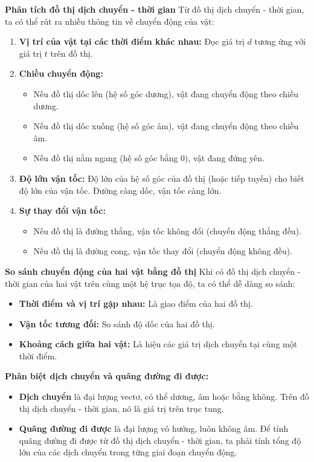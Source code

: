 \begin{hoatdong}
\textbf{Phân tích đồ thị dịch chuyển - thời gian}
Từ đồ thị dịch chuyển - thời gian, ta có thể rút ra nhiều thông tin về chuyển động của vật:
\begin{enumerate}
    \item \textbf{Vị trí của vật tại các thời điểm khác nhau:} Đọc giá trị $d$ tương ứng với giá trị $t$ trên đồ thị.
    \item \textbf{Chiều chuyển động:}
    \begin{itemize}
        \item Nếu đồ thị dốc lên (hệ số góc dương), vật đang chuyển động theo chiều dương.
        \item Nếu đồ thị dốc xuống (hệ số góc âm), vật đang chuyển động theo chiều âm.
        \item Nếu đồ thị nằm ngang (hệ số góc bằng 0), vật đang đứng yên.
    \end{itemize}
    \item \textbf{Độ lớn vận tốc:} Độ lớn của hệ số góc của đồ thị (hoặc tiếp tuyến) cho biết độ lớn của vận tốc. Đường càng dốc, vận tốc càng lớn.
    \item \textbf{Sự thay đổi vận tốc:}
    \begin{itemize}
        \item Nếu đồ thị là đường thẳng, vận tốc không đổi (chuyển động thẳng đều).
        \item Nếu đồ thị là đường cong, vận tốc thay đổi (chuyển động không đều).
    \end{itemize}
\end{enumerate}
\end{hoatdong}

\begin{emcothe}
\textbf{So sánh chuyển động của hai vật bằng đồ thị}
Khi có đồ thị dịch chuyển - thời gian của hai vật trên cùng một hệ trục tọa độ, ta có thể dễ dàng so sánh:
\begin{itemize}
    \item \textbf{Thời điểm và vị trí gặp nhau:} Là giao điểm của hai đồ thị.
    \item \textbf{Vận tốc tương đối:} So sánh độ dốc của hai đồ thị.
    \item \textbf{Khoảng cách giữa hai vật:} Là hiệu các giá trị dịch chuyển tại cùng một thời điểm.
\end{itemize}
\end{emcothe}

\begin{chuy}
\textbf{Phân biệt dịch chuyển và quãng đường đi được:}
\begin{itemize}
    \item \textbf{Dịch chuyển} là đại lượng vectơ, có thể dương, âm hoặc bằng không. Trên đồ thị dịch chuyển - thời gian, nó là giá trị trên trục tung.
    \item \textbf{Quãng đường đi được} là đại lượng vô hướng, luôn không âm. Để tính quãng đường đi được từ đồ thị dịch chuyển - thời gian, ta phải tính tổng độ lớn của các dịch chuyển trong từng giai đoạn chuyển động.
\end{itemize}
\end{chuy}
